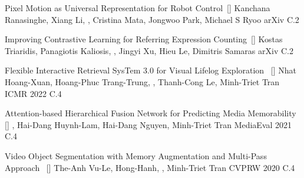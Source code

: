 
\begin{publications}
\publication
    {Pixel Motion as Universal Representation for Robot Control}{~[\href{https://arxiv.org/abs/2505.07817}{\small{\linkSymbol}}]}
    {Kanchana Ranasinghe, Xiang Li, \underline{}, Cristina Mata, Jongwoo Park, Michael S Ryoo}
    {arXiv} {} {C.2}

\publication
    {Improving Contrastive Learning for Referring Expression Counting}{~[\href{https://arxiv.org/abs/2505.22850}{\small{\linkSymbol}}]}
    {Kostas Triaridis, Panagiotis Kaliosis, \underline{}, Jingyi Xu, Hieu Le, Dimitris Samaras}
    {arXiv} {} {C.2}

	
\publication
    {Flexible Interactive Retrieval SysTem 3.0 for Visual Lifelog Exploration}{~ [\href{https://dl.acm.org/doi/abs/10.1145/3512729.3533013}{\small{\linkSymbol}}]}
    {Nhat Hoang-Xuan, Hoang-Phuc Trang-Trung, \underline{}, Thanh-Cong Le,  Minh-Triet Tran}
	{ICMR 2022} {} {C.4}

	 	
\publication
    {Attention-based Hierarchical Fusion Network for Predicting Media Memorability}{~ [\href{https://ceur-ws.org/Vol-3181/paper31.pdf}{\small{\linkSymbol}}]}
    {\underline {}, Hai-Dang Huynh-Lam, Hai-Dang Nguyen, Minh-Triet Tran} %
	{MediaEval 2021} {} {C.4}


\publication
    {Video Object Segmentation with Memory Augmentation and Multi-Pass Approach}{~ [\href{https://davischallenge.org/challenge2020/papers/DAVIS-Semisupervised-Challenge-6th-Team.pdf}{\small{\linkSymbol}}]}
    {The-Anh Vu-Le, Hong-Hanh, \underline {}, Minh-Triet Tran} %
     {CVPRW 2020} {} {C.4}

\end{publications}
